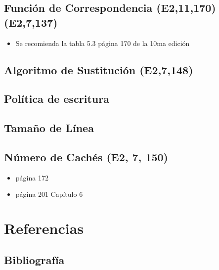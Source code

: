 \documentclass[presentation]{beamer}
\begin{document}
\subsection{Función de Correspondencia (E2,11,170)(E2,7,137)}
\label{sec:orge603259}
\begin{itemize}
\item Se recomienda la tabla 5.3 página 170 de la 10ma edición
\end{itemize}
\subsection{Algoritmo de Sustitución (E2,7,148)}
\label{sec:orgec129b6}
\subsection{Política de escritura}
\label{sec:orgedec68d}
\subsection{Tamaño de Línea}
\label{sec:orgd75b599}
\subsection{Número de Cachés (E2, 7, 150)}
\label{sec:org57d8a1b}
\begin{itemize}
\item \autocite{stallings2006} página 172
\item \autocite{stallings2022computer} página 201 Capítulo 6
\end{itemize}

\section{Referencias}
\label{sec:org2c9c595}
\subsection{Bibliografía}
\label{sec:org17f32cf}
\printbibliography
\end{document}
